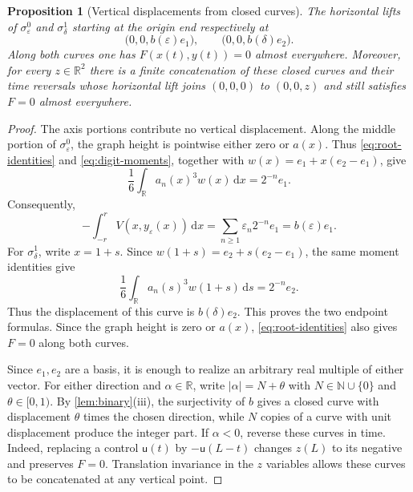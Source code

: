 \documentclass[11pt]{amsart}
\newtheorem{proposition}[theorem]{Proposition}
\numberwithin{equation}{section}
\theoremstyle{remark}
\newcommand{\R}{\mathbb R}
\newcommand{\N}{\mathbb N}
\newcommand{\dd}{\,\mathrm d}
\begin{document}
\begin{proposition}[Vertical displacements from closed curves]\label{prop:vertical-curves}
The horizontal lifts of $\sigma^0_\varepsilon$ and
$\sigma^1_\delta$ starting at the origin end respectively at
\begin{equation}
 \bigl(0,0,b(\varepsilon)e_1\bigr),
 \qquad
 \bigl(0,0,b(\delta)e_2\bigr).
\end{equation}
Along both curves one has $F(x(t),y(t))=0$ almost everywhere.
Moreover, for every $z\in\R^2$ there is a finite concatenation of these
closed curves and their time reversals whose horizontal lift joins
$(0,0,0)$ to $(0,0,z)$ and still satisfies $F=0$ almost everywhere.
\end{proposition}

\begin{proof}
The axis portions contribute no vertical displacement.  Along the
middle portion of $\sigma^0_\varepsilon$, the graph height is pointwise
either zero or $a(x)$.  Thus \eqref{eq:root-identities} and
\eqref{eq:digit-moments}, together with
$w(x)=e_1+x(e_2-e_1)$, give
\begin{equation}\label{eq:first-direction-moment}
 \frac16\int_\R a_n(x)^3w(x)\dd x=2^{-n}e_1.
\end{equation}
Consequently,
\begin{equation}
 -\int_{-r}^rV(x,y_\varepsilon(x))\dd x
 =\sum_{n\geq1}\varepsilon_n2^{-n}e_1
 =b(\varepsilon)e_1.
\end{equation}
For $\sigma^1_\delta$, write $x=1+s$.  Since
$w(1+s)=e_2+s(e_2-e_1)$, the same moment identities give
\begin{equation}\label{eq:second-direction-moment}
 \frac16\int_\R a_n(s)^3w(1+s)\dd s=2^{-n}e_2.
\end{equation}
Thus the displacement of this curve is $b(\delta)e_2$.  This proves the two
endpoint formulas.  Since the graph height is zero or $a(x)$,
\eqref{eq:root-identities} also gives $F=0$ along both curves.

Since $e_1,e_2$ are a basis, it is enough to realize an arbitrary real
multiple of either vector.  For either direction and $\alpha\in\R$, write
$|\alpha|=N+\theta$ with $N\in\N\cup\{0\}$ and $\theta\in[0,1)$.
By \cref{lem:binary}\textup{(iii)}, the surjectivity of $b$ gives a
closed curve with displacement $\theta$ times the chosen direction,
while $N$ copies of a curve with unit displacement produce the integer
part.  If $\alpha<0$, reverse these curves in time.  Indeed, replacing a
control $\mathsf{u}(t)$ by $-\mathsf{u}(L-t)$ changes $z(L)$ to its negative and preserves $F=0$.
Translation invariance in the $z$ variables allows these curves to be
concatenated at any vertical point.
\end{proof}
\end{document}
